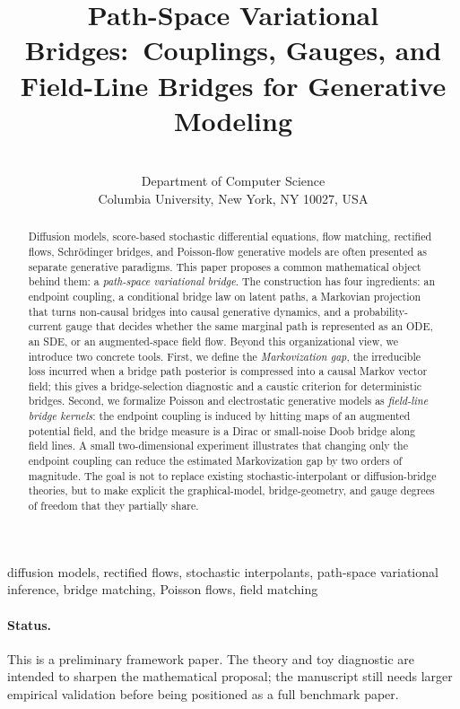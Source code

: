 \documentclass[twoside,11pt]{jmlr}
\title[Path-Space Variational Bridges]{Path-Space Variational Bridges:\
Couplings, Gauges, and Field-Line Bridges for Generative Modeling}
\author[Zhang]{%
\Name{Tiantian Zhang} \Email{t.zhang8@columbia.edu}\\
\addr Department of Computer Science\\
Columbia University, New York, NY 10027, USA
}
\numberwithin{equation}{section}
\begin{document}
\maketitle

\begin{abstract}
Diffusion models, score-based stochastic differential equations, flow matching, rectified flows, Schr\"odinger bridges, and Poisson-flow generative models are often presented as separate generative paradigms. This paper proposes a common mathematical object behind them: a \emph{path-space variational bridge}. The construction has four ingredients: an endpoint coupling, a conditional bridge law on latent paths, a Markovian projection that turns non-causal bridges into causal generative dynamics, and a probability-current gauge that decides whether the same marginal path is represented as an ODE, an SDE, or an augmented-space field flow. Beyond this organizational view, we introduce two concrete tools. First, we define the \emph{Markovization gap}, the irreducible loss incurred when a bridge path posterior is compressed into a causal Markov vector field; this gives a bridge-selection diagnostic and a caustic criterion for deterministic bridges. Second, we formalize Poisson and electrostatic generative models as \emph{field-line bridge kernels}: the endpoint coupling is induced by hitting maps of an augmented potential field, and the bridge measure is a Dirac or small-noise Doob bridge along field lines. A small two-dimensional experiment illustrates that changing only the endpoint coupling can reduce the estimated Markovization gap by two orders of magnitude. The goal is not to replace existing stochastic-interpolant or diffusion-bridge theories, but to make explicit the graphical-model, bridge-geometry, and gauge degrees of freedom that they partially share.
\end{abstract}

\begin{keywords}
diffusion models, rectified flows, stochastic interpolants, path-space variational inference, bridge matching, Poisson flows, field matching
\end{keywords}

\paragraph{Status.}
This is a preliminary framework paper. The theory and toy diagnostic are intended to sharpen the mathematical proposal; the manuscript still needs larger empirical validation before being positioned as a full benchmark paper.
\end{document}
